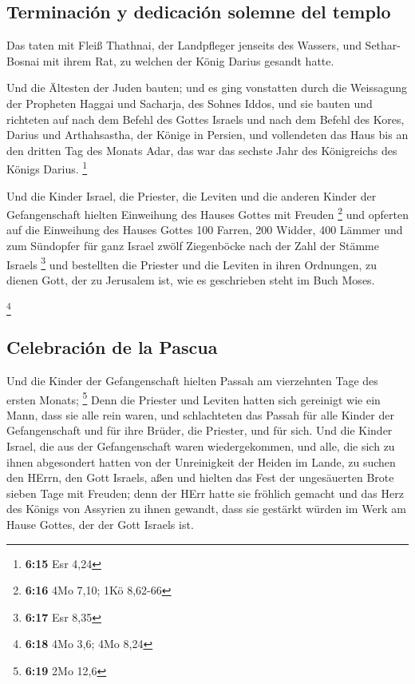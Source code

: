 \hypertarget{terminaciuxf3n-y-dedicaciuxf3n-solemne-del-templo}{%
\subsection{Terminación y dedicación solemne del
templo}\label{terminaciuxf3n-y-dedicaciuxf3n-solemne-del-templo}}

 Das taten mit Fleiß Thathnai, der Landpfleger jenseits
des Wassers, und Sethar-Bosnai mit ihrem Rat, zu welchen der König
Darius gesandt hatte.

 Und die Ältesten der Juden bauten; und es ging
vonstatten durch die Weissagung der Propheten Haggai und Sacharja, des
Sohnes Iddos, und sie bauten und richteten auf nach dem Befehl des
Gottes Israels und nach dem Befehl des Kores, Darius und Arthahsastha,
der Könige in Persien,  und vollendeten das Haus bis an
den dritten Tag des Monats Adar, das war das sechste Jahr des
Königreichs des Königs Darius. \footnote{\textbf{6:15} Esr 4,24}

 Und die Kinder Israel, die Priester, die Leviten und die
anderen Kinder der Gefangenschaft hielten Einweihung des Hauses Gottes
mit Freuden \footnote{\textbf{6:16} 4Mo 7,10; 1Kö 8,62-66}
 und opferten auf die Einweihung des Hauses Gottes 100
Farren, 200 Widder, 400 Lämmer und zum Sündopfer für ganz Israel zwölf
Ziegenböcke nach der Zahl der Stämme Israels \footnote{\textbf{6:17} Esr
  8,35}  und bestellten die Priester und die Leviten in
ihren Ordnungen, zu dienen Gott, der zu Jerusalem ist, wie es
geschrieben steht im Buch Moses.

\footnote{\textbf{6:18} 4Mo 3,6; 4Mo 8,24}

\hypertarget{celebraciuxf3n-de-la-pascua}{%
\subsection{Celebración de la
Pascua}\label{celebraciuxf3n-de-la-pascua}}

 Und die Kinder der Gefangenschaft hielten Passah am
vierzehnten Tage des ersten Monats; \footnote{\textbf{6:19} 2Mo 12,6}
 Denn die Priester und Leviten hatten sich gereinigt wie
ein Mann, dass sie alle rein waren, und schlachteten das Passah für alle
Kinder der Gefangenschaft und für ihre Brüder, die Priester, und für
sich.  Und die Kinder Israel, die aus der Gefangenschaft
waren wiedergekommen, und alle, die sich zu ihnen abgesondert hatten von
der Unreinigkeit der Heiden im Lande, zu suchen den HErrn, den Gott
Israels, aßen  und hielten das Fest der ungesäuerten
Brote sieben Tage mit Freuden; denn der HErr hatte sie fröhlich gemacht
und das Herz des Königs von Assyrien zu ihnen gewandt, dass sie gestärkt
würden im Werk am Hause Gottes, der der Gott Israels ist.

